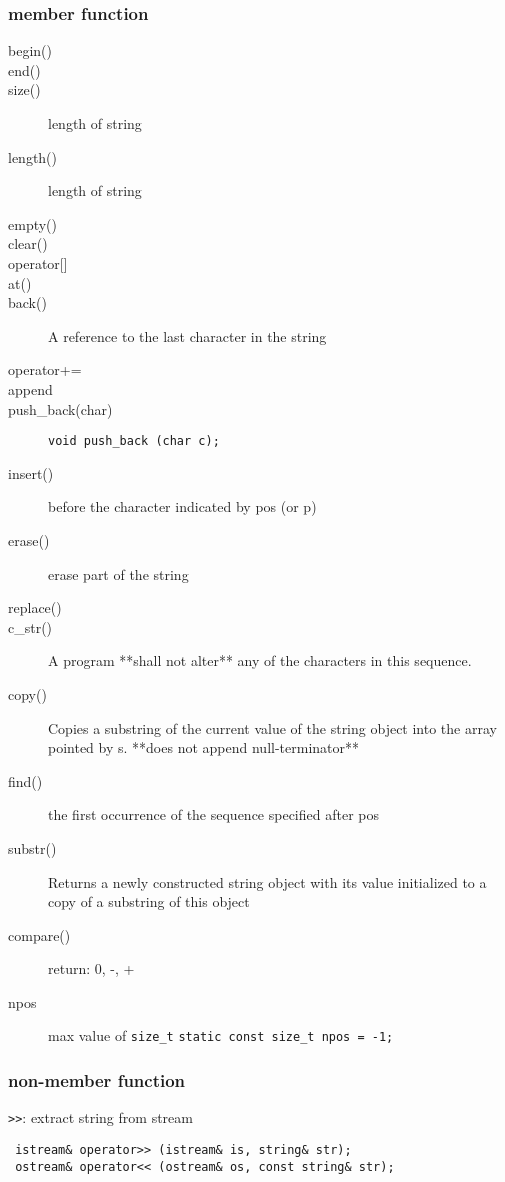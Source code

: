 \subsubsection{member function}
\begin{description}
\item [begin()]
\item [end()]
\item [size()] length of string
\item [length()] length of string
\item [empty()]
\item [clear()]
\item [{operator[]}]
\item [at()]
\item [back()] A reference to the last character in the string
\item [operator+=]
\item [append]
\item [push\_back(char)] \verb$void push_back (char c);$
\item [insert()] before the character indicated by pos (or p)
\item [erase()] erase part of the string
\item [replace()]
\item [c\_str()] A program **shall not alter** any of the characters in
  this sequence.
\item [copy()] Copies a substring of the current value of the string
  object into the array pointed by s.  **does not append
  null-terminator**
\item [find()] the first occurrence of the sequence specified after pos
\item [substr()] Returns a newly constructed string object with its
  value initialized to a copy of a substring of this object
\item [compare()] return: 0, -, +
\item [npos] max value of \verb$size_t$ \verb$static const size_t npos = -1;$
\end{description}

\subsubsection{non-member function}


\verb$>>$: extract string from stream
\begin{lstlisting}
 istream& operator>> (istream& is, string& str);
 ostream& operator<< (ostream& os, const string& str);
\end{lstlisting}

